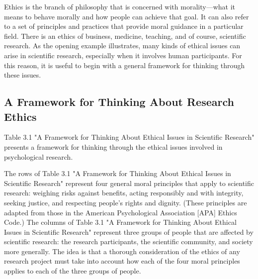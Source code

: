Ethics is the branch of philosophy that is concerned with morality---what it means to behave morally and how people can achieve that goal. It can also refer to a set of principles and practices that provide moral guidance in a particular field. There is an ethics of business, medicine, teaching, and of course, scientific research. As the opening example illustrates, many kinds of ethical issues can arise in scientific research, especially when it involves human participants. For this reason, it is useful to begin with a general framework for thinking through these issues.

\subsection{A Framework for Thinking About Research Ethics}

Table 3.1 "A Framework for Thinking About Ethical Issues in Scientific Research" presents a framework for thinking through the ethical issues involved in psychological research.

 The rows of Table 3.1 "A Framework for Thinking About Ethical Issues in Scientific Research" represent four general moral principles that apply to scientific research: weighing risks against benefits, acting responsibly and with integrity, seeking justice, and respecting people's rights and dignity. (These principles are adapted from those in the American Psychological Association [APA] Ethics Code.) The columns of Table 3.1 "A Framework for Thinking About Ethical Issues in Scientific Research" represent three groups of people that are affected by scientific research: the research participants, the scientific community, and society more generally. The idea is that a thorough consideration of the ethics of any research project must take into account how each of the four moral principles applies to each of the three groups of people.

